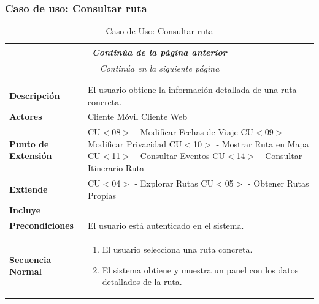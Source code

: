 \subsubsection*{Caso de uso: Consultar ruta}
\begin{longtable}{| p{4cm} | p{10cm} |}
\endfirsthead
\multicolumn{2}{c}{\textit{Continúa de la página anterior}}\\[12pt]
\hline
\endhead
\hline
\multicolumn{2}{c}{\textit{Continúa en la siguiente página}} \\
\endfoot
\hline
\caption{Caso de Uso: Consultar ruta}\label{fig:1}\\
\endlastfoot


\hline
\multicolumn{2}{|c|}{\textbf{CU$<$07$>$ - Consultar Ruta}} \\

\hline
\textbf{Descripción} &
El usuario obtiene la información detallada de una ruta concreta.\\

\hline
\textbf{Actores} &
Cliente Móvil\newline
Cliente Web\\

\hline
\textbf{Punto de Extensión} &
CU$<$08$>$ - Modificar Fechas de Viaje\newline
CU$<$09$>$ - Modificar Privacidad\newline
CU$<$10$>$ - Mostrar Ruta en Mapa\newline
CU$<$11$>$ - Consultar Eventos\newline
CU$<$14$>$ - Consultar Itinerario Ruta
\\

\hline
\textbf{Extiende} &
CU$<$04$>$ - Explorar Rutas\newline
CU$<$05$>$ - Obtener Rutas Propias
\\

\hline
\textbf{Incluye} &
\\

\hline
\textbf{Precondiciones} &
El usuario está autenticado en el sistema.\\

\hline
\textbf{Secuencia Normal} &\mbox{}\par\vspace{-\baselineskip}
\begin{enumerate}[leftmargin=0.7cm, topsep=0.1cm]
\item El usuario selecciona una ruta concreta.
\item El sistema obtiene y muestra un panel con los datos detallados de la ruta.
\end{enumerate}\\


\end{longtable}

